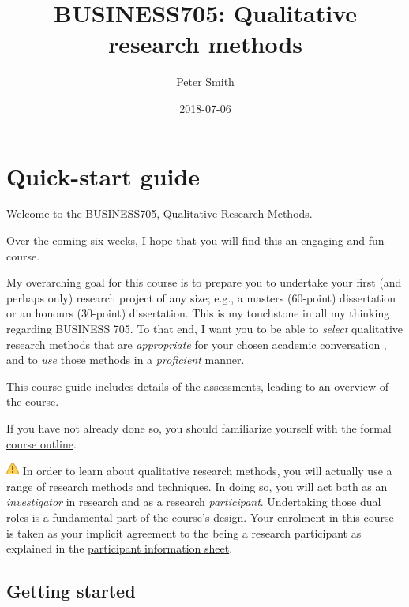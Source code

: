 \documentclass[]{book}
\title{BUSINESS705: Qualitative research methods}
\author{Peter Smith}
\date{2018-07-06}
\theoremstyle{definition}
\theoremstyle{definition}
\theoremstyle{definition}
\theoremstyle{remark}
\begin{document}
\maketitle

{
\setcounter{tocdepth}{1}
\tableofcontents
}
\hypertarget{quick-start-guide}{%
\chapter*{Quick-start guide}\label{quick-start-guide}}

Welcome to the BUSINESS705, Qualitative Research Methods.

Over the coming six weeks, I hope that you will find this an engaging
and fun course.

My overarching goal for this course is to prepare you to undertake your
first (and perhaps only) research project of any size; e.g., a masters
(60-point) dissertation or an honours (30-point) dissertation. This is
my touchstone in all my thinking regarding BUSINESS 705. To that end, I
want you to be able to \emph{select} qualitative research methods that
are \emph{appropriate} for your chosen academic conversation
\autocite{huff_2009_designingresearchpublication}, and to \emph{use}
those methods in a \emph{proficient} manner.

This course guide includes details of the
\protect\hyperlink{assessment-overview}{assessments}, leading to an
\protect\hyperlink{course-overview}{overview} of the course.

If you have not already done so, you should familiarize yourself with
the formal \protect\hyperlink{course-outline}{course outline}.

\includegraphics{images/warning.png} In order to learn about qualitative
research methods, you will actually use a range of research methods and
techniques. In doing so, you will act both as an \emph{investigator} in
research and as a research \emph{participant}. Undertaking those dual
roles is a fundamental part of the course's design. Your enrolment in
this course is taken as your implicit agreement to the being a research
participant as explained in the \protect\hyperlink{pis}{participant
information sheet}.

\hypertarget{getting-started}{%
\section*{Getting started}\label{getting-started}}
\end{document}
